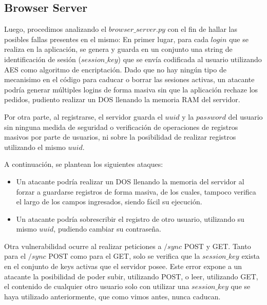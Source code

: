 \documentclass[10pt, a4paper]{article}
\begin{document}
\newpage
\subsection{Browser Server}
Luego, procedimos analizando el $browser\_server.py$ con el fin de hallar las posibles fallas presentes en el mismo:
En primer lugar, para cada $login$ que se realiza en la aplicación, se genera y guarda en un conjunto una string de identificación de sesión ($session\_key$) que se envía codificada al usuario utilizando AES como algoritmo de encriptación. Dado que no hay ningún tipo de mecanisimo en el código para caducar o borrar las sesiones activas, un atacante podría generar múltiples logins de forma masiva sin que la aplicación rechaze los pedidos, pudiento realizar un DOS llenando la memoria RAM del servidor.

Por otra parte, al registrarse, el servidor guarda el $uuid$ y la $password$ del usuario sin ninguna medida de seguridad o verificación de operaciones de registros masivos por parte de usuarios, ni sobre la posibilidad de realizar registros utilizando el mismo $uuid$.

A continuación, se plantean los siguientes ataques:
\begin{shaded}
\begin{itemize}
\item Un atacante podría realizar un DOS llenando la memoria del servidor al forzar a guardarse registros de forma masiva, de los cuales, tampoco verifica el largo de los campos ingresados, siendo fácil su ejecución.
\item Un atacante podría sobrescribir el registro de otro usuario, utilizando su mismo $uuid$, pudiendo cambiar su contraseña.
\end{itemize}
\end{shaded}

Otra vulnerabilidad ocurre al realizar peticiones a $/sync$ POST y GET. Tanto para el $/sync$ POST como para el GET, solo se verifica que la $session\_key$ exista en el conjunto de keys activas que el servidor posee. Este error expone a un atacante la posibilidad de poder subir, utilizando POST, o leer, utilizando GET, el contenido de cualquier otro usuario solo con utilizar una $session\_key$ que se haya utilizado anteriormente, que como vimos antes, nunca caducan.
\end{document}
